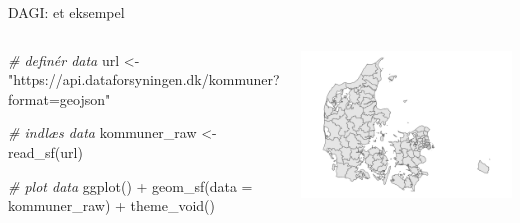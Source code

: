 \documentclass[
  8pt,
  ignorenonframetext,
  aspectratio=169]{beamer}
\newenvironment{Shaded}{}{}
\newcommand{\AttributeTok}[1]{\textcolor[rgb]{0.49,0.56,0.16}{#1}}
\newcommand{\CommentTok}[1]{\textcolor[rgb]{0.38,0.63,0.69}{\textit{#1}}}
\newcommand{\FunctionTok}[1]{\textcolor[rgb]{0.02,0.16,0.49}{#1}}
\newcommand{\NormalTok}[1]{#1}
\newcommand{\OtherTok}[1]{\textcolor[rgb]{0.00,0.44,0.13}{#1}}
\newcommand{\SpecialCharTok}[1]{\textcolor[rgb]{0.25,0.44,0.63}{#1}}
\newcommand{\StringTok}[1]{\textcolor[rgb]{0.25,0.44,0.63}{#1}}
\newcommand{\columnsbegin}{\begin{columns}}
\newcommand{\columnsend}{\end{columns}}
\begin{document}
\begin{frame}[fragile]{DAGI: et eksempel}
\protect\hypertarget{dagi-et-eksempel}{}
\columnsbegin
{}

\tiny

\begin{Shaded}
\begin{Highlighting}[]
\CommentTok{\# definér data}
\NormalTok{url }\OtherTok{\textless{}{-}} 
  \StringTok{"https://api.dataforsyningen.dk/kommuner?format=geojson"}

\CommentTok{\# indlæs data}
\NormalTok{kommuner\_raw }\OtherTok{\textless{}{-}} 
  \FunctionTok{read\_sf}\NormalTok{(url)}

\CommentTok{\# plot data}
\FunctionTok{ggplot}\NormalTok{() }\SpecialCharTok{+}
  \FunctionTok{geom\_sf}\NormalTok{(}\AttributeTok{data =}\NormalTok{ kommuner\_raw) }\SpecialCharTok{+}
  \FunctionTok{theme\_void}\NormalTok{()}
\end{Highlighting}
\end{Shaded}

\normalsize {}

\tiny

\includegraphics{crashcourse_slides_files/figure-beamer/unnamed-chunk-31-1.pdf}

\normalsize \columnsend
\end{frame}
\end{document}

